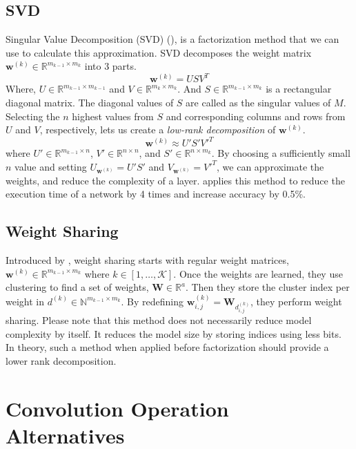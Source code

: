 \subsection{SVD}
Singular Value Decomposition (SVD) (\cite{golub1970singular}), is a factorization method that we can use to calculate this approximation. SVD decomposes the weight matrix $\mathbf{w}^{(k)} \in \mathbb{R}^{m_{k-1} \times m_k}$ into $3$ parts. 
$$ \mathbf{w}^{(k)} = USV^T $$
Where, $U \in \mathbb{R}^{m_{k-1} \times m_{k-1}}$ and $V\in \mathbb{R}^{m_{k} \times m_k}$. And $S \in \mathbb{R}^{m_{k-1} \times m_k}$ is a rectangular diagonal matrix. The diagonal values of $S$ are called as the singular values of $M$. Selecting the $n$ highest values from $S$ and corresponding columns and rows from $U$ and $V$, respectively, lets us create a \textit{low-rank decomposition} of $\mathbf{w}^{(k)}$. 
$$ \mathbf{w}^{(k)} \approx U'S'V'^T $$
where $U' \in \mathbb{R}^{m_{k-1} \times n}$, $V' \in \mathbb{R}^{n \times n}$, and $S' \in \mathbb{R}^{n \times m_k}$. By choosing a sufficiently small $n$ value and setting $U_{\mathbf{w}^{(k)}}=U'S'$ and $V_{\mathbf{w}^{(k)}} = V'^T$, we can approximate the weights, and reduce the complexity of a layer. \cite{zhang2016accelerating} applies this method to reduce the execution time of a network by 4 times and increase accuracy by 0.5\%.

\subsection{Weight Sharing}
Introduced by \cite{nowlan1992simplifying}, weight sharing starts with regular weight matrices, $\mathbf{w}^{(k)} \in \mathbb{R}^{m_{k-1} \times m_k}$ where $k \in [1, \ldots, \mathcal{K}]$. Once the weights are learned, they use clustering to find a set of weights, $\mathbf{W} \in \mathbb{R}^{a}$. Then they store the cluster index per weight in $d^{(k)} \in \mathbb{N}^{m_{k-1} \times m_k}$. By redefining $\mathbf{w}^{(k)}_{i,j} = \mathbf{W}_{d^{(k)}_{i,j}}$, they perform weight sharing. Please note that this method does not necessarily reduce model complexity by itself. It reduces the model size by storing indices using less bits. In theory, such a method when applied before factorization should provide a lower rank decomposition. 

\section{Convolution Operation Alternatives}

